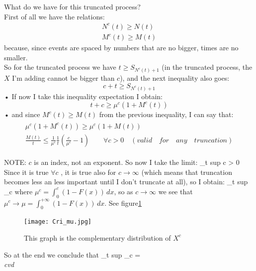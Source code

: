 	What do we have for this truncated process?\\
	First of all we have the relations:
	\begin{equation}
	\begin{split}
	N^c(t) \geq N(t)\\
	M^c(t) \geq M(t)
	\end{split}
	\end{equation}
	because, since events are spaced by numbers that are no bigger, times are no smaller.\\

	So for the truncated process we have $t \geq S_{N^c(t) +1}$ (in the truncated process, the $X$ I'm adding cannot be bigger than $c$), and the next inequality also goes:
	\begin{equation}
	c+t \geq S_{N^c(t)+1}
	\end{equation}•
	If now I take this inequality expectation I obtain:
	\begin{equation}
	t+c \geq \mu^c(1+M^c(t))
	\end{equation}•
	and since $M^c(t) \geq M(t)$ from the previous inequality, I can say that:
	\begin{align}
	\begin{split}
	\mu^c(1+M^c(t)) \geq \mu^c(1+M(t))\\
	\frac{M(t)}{t} \leq \frac{1}{\mu^c} \frac{1}{t}(\frac{c}{\mu^c}-1) \qquad \forall c > 0 \quad (valid\quad for\quad any\quad truncation)
	\end{split}
	\end{align}

	NOTE: $c$ is an index, not an exponent.
	So now I take the limit:
	\beq
	\lim_{t \to \infty} sup  \leq {} \qquad \forall c > 0
	\eeq
	Since it is true $\forall c$ , it is true also for $c \to \infty$ (which means that truncation becomes less an less important until I don't truncate at all), so I obtain:
	\beq
	\lim_{t \to \infty} sup  \leq \lim_{c \to \infty} 
	\eeq
	where $\mu^c = \int_0^c(1-F(x))\,dx$, so as $c \to \infty$ we see that $\mu^c \to \mu = \int_0^{+\infty}(1-F(x))\,dx$. See figure\ref{fig:mu}
	\begin{figure}
	\centering
	\texttt{[image: Cri\_mu.jpg]}
	\caption{This graph is the complementary distribution of $X^c$}
	\label{fig:mu}
	\end{figure}
	So at the end we conclude that
	\beq
	\lim_{t \to \infty} sup  \leq \lim_{c \to \infty}  = 
	\eeq
	\\
	\textit{cvd}
